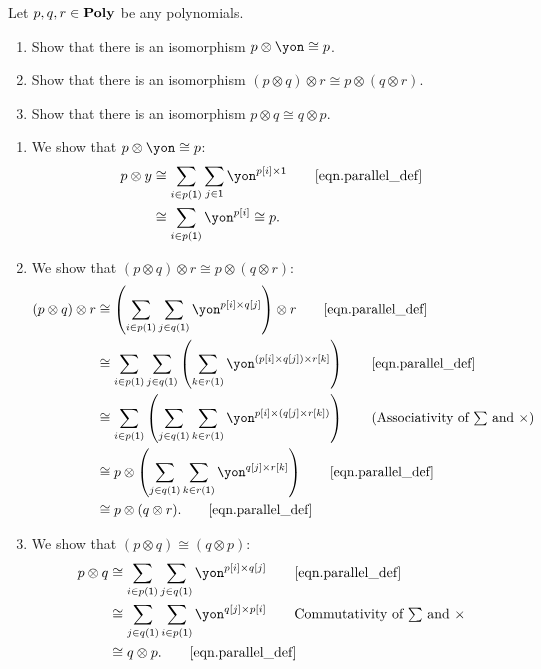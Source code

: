 \documentclass[Book-Poly]{subfiles}
\begin{document}
\begin{exercise}\label{exc.prepare_poly_smc}
Let $p,q,r\in\mathbf{Poly}$ be any polynomials.
\begin{enumerate}
  \item Show that there is an isomorphism $p\otimes\yon\cong p$.
  \item Show that there is an isomorphism $(p\otimes q)\otimes r\cong p\otimes (q\otimes r)$.
  \item Show that there is an isomorphism $p\otimes q \cong q\otimes p$.
 \qedhere
\end{enumerate}
\begin{solution}
\begin{enumerate}
  \item We show that $p\otimes\yon\cong p$:
  \begin{align*}
      p \otimes y &\iso \sum_{i \in p(\1)} \sum_{j \in \1} \yon^{p[i] \times \1} \tag*{\eqref{eqn.parallel_def}} \\
      &\iso \sum_{i \in p(\1)} \yon^{p[i]} \iso p.
  \end{align*}
  
  \item We show that $(p\otimes q)\otimes r\cong p\otimes (q\otimes r)$:
  \begin{align*}
      (p \otimes q) \otimes r &\iso \left(\sum_{i \in p(\1)} \sum_{j \in q(\1)} \yon^{p[i] \times q[j]}\right) \otimes r \tag*{\eqref{eqn.parallel_def}} \\
      &\iso \sum_{i \in p(\1)} \sum_{j \in q(\1)} \left(\sum_{k \in r(\1)} \yon^{(p[i] \times q[j]) \times r[k]}\right) \tag*{\eqref{eqn.parallel_def}} \\
      &\iso \sum_{i \in p(\1)} \left(\sum_{j \in q(\1)} \sum_{k \in r(\1)} \yon^{p[i] \times (q[j] \times r[k])}\right) \tag{Associativity of $\sum$ and $\times$} \\
      &\iso p \otimes \left(\sum_{j \in q(\1)} \sum_{k \in r(\1)} \yon^{q[j] \times r[k]}\right) \tag*{\eqref{eqn.parallel_def}} \\
      &\iso p \otimes (q \otimes r). \tag*{\eqref{eqn.parallel_def}} \\
  \end{align*}
  
  \item We show that $(p\otimes q)\cong(q\otimes p)$:
  \begin{align*}
      p \otimes q &\iso \sum_{i \in p(\1)} \sum_{j \in q(\1)} \yon^{p[i] \times q[j]} \tag*{\eqref{eqn.parallel_def}} \\
      &\iso \sum_{j \in q(\1)} \sum_{i \in p(\1)} \yon^{q[j] \times p[i]} \tag*{Commutativity of $\sum$ and $\times$} \\
      &\iso q \otimes p. \tag*{\eqref{eqn.parallel_def}} \\
  \end{align*}
\end{enumerate}
\end{solution}
\end{exercise}
\end{document}
